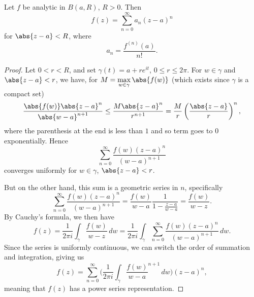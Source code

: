 \begin{theorem}\label{thm3.4}
	Let $f$ be analytic in $B(a, R)$, $R > 0$.
	Then
	\[
		f(z) = \sum_{n = 0}^\infty a_n (z - a)^n
	\]
	for $\abs{z - a} < R$, where
	\[
		a_n = \frac{f^{(n)}(a)}{n!}.
	\]
\end{theorem}

\begin{proof}
	Let $0 < r < R$, and set $\gamma(t) = a + r e^{i t}$, $0 \leq r \leq 2 \pi$.
	For $w \in \gamma$ and $\abs{z - a} < r$, we have, for $M = \max\limits_{w \in \gamma} \abs{f(w)}$ (which exists since $\gamma$ is a compact set)
	\[
		\frac{\abs{f(w)} \abs{z - a}^n}{\abs{w - a}^{n + 1}} \leq \frac{M \abs{z - a}^n}{r^{n + 1}} = \frac{M}{r} \left ( \frac{\abs{z - a}}{r} \right )^n,
	\]
	where the parenthesis at the end is less than $1$ and so term goes to $0$ exponentially.
	Hence
	\[
		\sum_{n = 0}^\infty \frac{f(w) (z - a)^n}{(w - a)^{n + 1}}
	\]
	converges uniformly for $w \in \gamma$, $\abs{z - a} < r$.

	But on the other hand, this sum is a geometric series in $n$, specifically
	\[
		\sum_{n = 0}^\infty \frac{f(w) (z - a)^n}{(w - a)^{n + 1}} = \frac{f(w)}{w - a} \frac{1}{1 - \frac{z - a}{w - a}} = \frac{f(w)}{w - z}.
	\]
	By Cauchy's formula, we then have
	\[
		f(z) = \frac{1}{2 \pi i} \int_\gamma \frac{f(w)}{w - z} \, d w = \frac{1}{2 \pi i} \int_\gamma \sum_{n = 0}^\infty \frac{f(w) (z - a)^n}{(w - a)^{n + 1}} \, d w.
	\]
	Since the series is uniformly continuous, we can switch the order of summation and integration, giving us
	\[
		f(z) = \sum_{n = 0}^\infty \biggl ( \frac{1}{2 \pi i} \int_\gamma \frac{f(w)}{w - a}^{n + 1} \, d w \biggr ) (z - a)^n,
	\]
	meaning that $f(z)$ has a power series representation.
\end{proof}
